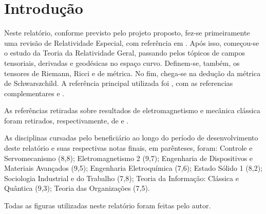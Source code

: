 \chapter*{Introdução}
Neste relatório, conforme previsto pelo projeto proposto, fez-se primeiramente uma revisão de Relatividade Especial, com referência em \cite{dray2012geometry}. Após isso, começou-se o estudo da Teoria da Relatividade Geral, passando pelos tópicos de campos tensoriais, derivadas e geodésicas no espaço curvo. Definem-se, também, os tensores de Riemann, Ricci e de métrica. No fim, chega-se na dedução da métrica de Schwarszchild. A referência principal utilizada foi \cite{foster2010short}, com as referencias complementares \cite{hartle2003gravity} e \cite{schutz2009first}. 

As referências retiradas sobre resultados de eletromagnetismo e mecânica clássica foram retirados, respectivamente, de \cite{griffiths2005introduction} e \cite{nussenzveig2013curso}.

As disciplinas cursadas pelo beneficiário ao longo do período de desenvolvimento deste relatório e suas respectivas notas finais, em parênteses, foram: Controle e Servomecanismo (8,8); Eletromagnetismo 2 (9,7); Engenharia de Dispositivos e Materiais Avançados (9,5); Engenharia Eletroquímica (7,6); Estado Sólido 1 (8,2); Sociologia Industrial e do Trabalho (7,8); Teoria da Informação: Clássica e Quântica (9,3); Teoria das Organizações (7,5).

Todas as figuras utilizadas neste relatório foram feitas pelo autor.


